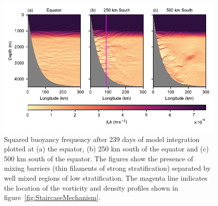 \begin{figure}[h]
    \centering
    \includegraphics{../figures/Figure2.pdf}
    \caption{Squared buoyancy frequency after 239 days of model integration plotted at (a) the equator,  (b) 250 km south of the equator and (c) 500 km south of the equator. The figures show the presence of mixing barriers (thin filaments of strong stratification) separated by well mixed regions of low stratification. The magenta line indicates the location of the vorticity and density profiles shown in figure~\ref{fig:StaircaseMechanism}.}
    \label{fig:staircase}
\end{figure}

